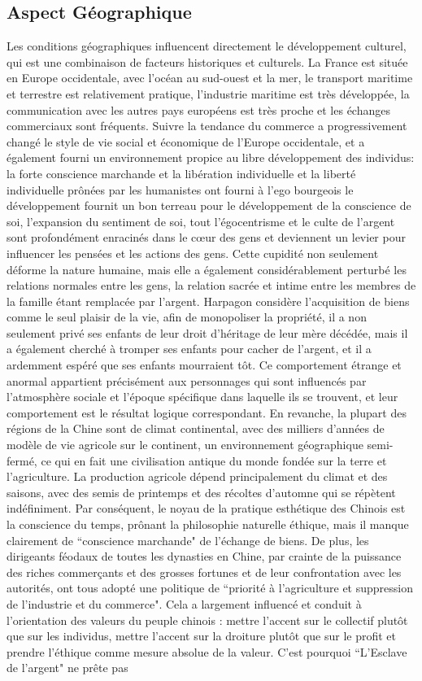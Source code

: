 \documentclass[UTF8,a4paper,12pt]{ctexart}
\numberwithin{equation}{section}
\begin{document}
\subsection{Aspect Géographique}
Les conditions géographiques influencent directement le développement culturel, qui est une combinaison de facteurs historiques et culturels. La France est située en Europe occidentale, avec l'océan au sud-ouest et la mer, le transport maritime et terrestre est relativement pratique, l'industrie maritime est très développée, la communication avec les autres pays européens est très proche et les échanges commerciaux sont fréquents. Suivre la tendance du commerce a progressivement changé le style de vie social et économique de l'Europe occidentale, et a également fourni un environnement propice au libre développement des individus: la forte conscience marchande et la libération individuelle et la liberté individuelle prônées par les humanistes ont fourni à l'ego bourgeois le développement fournit un bon terreau pour le développement de la conscience de soi, l'expansion du sentiment de soi, tout l'égocentrisme et le culte de l'argent sont profondément enracinés dans le cœur des gens et deviennent un levier pour influencer les pensées et les actions des gens. Cette cupidité non seulement déforme la nature humaine, mais elle a également considérablement perturbé les relations normales entre les gens, la relation sacrée et intime entre les membres de la famille étant remplacée par l'argent. Harpagon considère l'acquisition de biens comme le seul plaisir de la vie, afin de monopoliser la propriété, il a non seulement privé ses enfants de leur droit d'héritage de leur mère décédée, mais il a également cherché à tromper ses enfants pour cacher de l'argent, et il a ardemment espéré que ses enfants mourraient tôt. Ce comportement étrange et anormal appartient précisément aux personnages qui sont influencés par l'atmosphère sociale et l'époque spécifique dans laquelle ils se trouvent, et leur comportement est le résultat logique correspondant. En revanche, la plupart des régions de la Chine sont de climat continental, avec des milliers d'années de modèle de vie agricole sur le continent, un environnement géographique semi-fermé, ce qui en fait une civilisation antique du monde fondée sur la terre et l'agriculture. La production agricole dépend principalement du climat et des saisons, avec des semis de printemps et des récoltes d'automne qui se répètent indéfiniment. Par conséquent, le noyau de la pratique esthétique des Chinois est la conscience du temps, prônant la philosophie naturelle éthique, mais il manque clairement de ``conscience marchande" de l'échange de biens. De plus, les dirigeants féodaux de toutes les dynasties en Chine, par crainte de la puissance des riches commerçants et des grosses fortunes et de leur confrontation avec les autorités, ont tous adopté une politique de ``priorité à l'agriculture et suppression de l'industrie et du commerce". Cela a largement influencé et conduit à l'orientation des valeurs du peuple chinois : mettre l'accent sur le collectif plutôt que sur les individus, mettre l'accent sur la droiture plutôt que sur le profit et prendre l'éthique comme mesure absolue de la valeur. C'est pourquoi ``L'Esclave de l'argent" ne prête pas 
\end{document}
